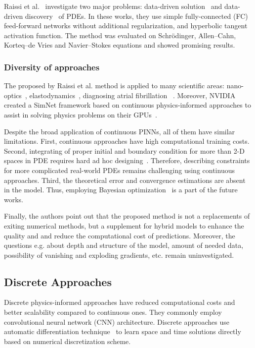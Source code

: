 Raissi et al.~\cite{Raissi19} investigate two major problems: data-driven solution~\cite{Raissi1} and data-driven discovery~\cite{Raissi2} of PDEs. In these works, they use simple fully-connected (FC) feed-forward networks without additional regularization, and hyperbolic tangent activation function. The method was evaluated on Schrödinger, Allen--Cahn, Korteq--de Vries and Navier--Stokes equations and showed promising results. 

\subsubsection{Diversity of approaches}
The proposed by Raissi et al. method is applied to many scientific areas: nano-optics~\cite{nanooptics}, elastodynamics~\cite{elastodynamics}, diagnosing atrial fibrillation  ~\cite{fibrillation}. Moreover, NVIDIA created a SimNet framework based on continuous physics-informed approaches to assist in solving physics problems on their GPUs~\cite{nvidia}.

Despite the broad application of continuous PINNs, all of them have similar limitations. First, continuous approaches have high computational training costs. Second, integrating of proper initial and boundary condition for more than 2-D spaces in PDE requires hard ad hoc designing~\cite{Gao21}. Therefore, describing constraints for more complicated real-world PDEs remains challenging using continuous approaches. Third, the theoretical error and convergence estimations are absent in the model. Thus, employing Bayesian optimization~\cite{sno12} is a part of the future works.

Finally, the authors point out that the proposed method is not a replacements of exiting numerical methods, but a supplement for hybrid models to enhance the quality and and reduce the computational cost of predictions. Moreover, the questions e.g. about depth and structure of the model, amount of needed data, possibility of vanishing and exploding gradients, etc. remain uninvestigated. 


\subsection{Discrete Approaches}
Discrete physics-informed approaches have reduced computational costs and better scalability compared to continuous ones. They commonly employ convolutional neural network (CNN) architecture. Discrete approaches use automatic differentiation technique~\cite{ad} to learn space and time solutions directly based on numerical discretization scheme.

